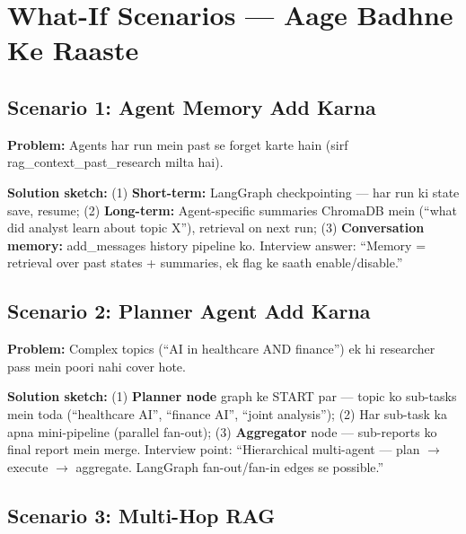 \section{What-If Scenarios --- Aage Badhne Ke Raaste}

\subsection{Scenario 1: Agent Memory Add Karna}

\begin{conceptbox}
\textbf{Problem:} Agents har run mein past se forget karte hain (sirf rag\_context\_past\_research milta hai).

\textbf{Solution sketch:} (1) \textbf{Short-term:} LangGraph checkpointing --- har run ki state save, resume; (2) \textbf{Long-term:} Agent-specific summaries ChromaDB mein (``what did analyst learn about topic X''), retrieval on next run; (3) \textbf{Conversation memory:} add\_messages history pipeline ko. Interview answer: ``Memory = retrieval over past states + summaries, ek flag ke saath enable/disable.''
\end{conceptbox}

\subsection{Scenario 2: Planner Agent Add Karna}

\begin{conceptbox}
\textbf{Problem:} Complex topics (``AI in healthcare AND finance'') ek hi researcher pass mein poori nahi cover hote.

\textbf{Solution sketch:} (1) \textbf{Planner node} graph ke START par --- topic ko sub-tasks mein toda (``healthcare AI'', ``finance AI'', ``joint analysis''); (2) Har sub-task ka apna mini-pipeline (parallel fan-out); (3) \textbf{Aggregator} node --- sub-reports ko final report mein merge. Interview point: ``Hierarchical multi-agent --- plan $\rightarrow$ execute $\rightarrow$ aggregate. LangGraph fan-out/fan-in edges se possible.''
\end{conceptbox}

\subsection{Scenario 3: Multi-Hop RAG}

